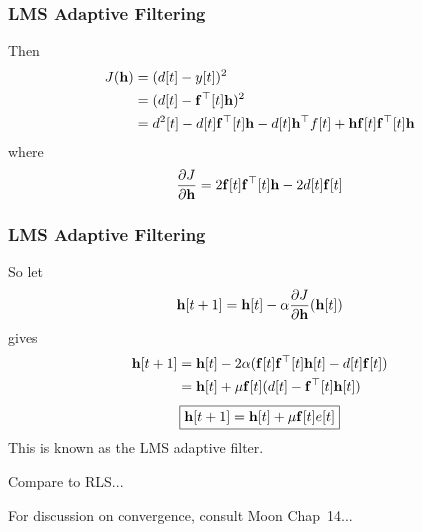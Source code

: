 \documentclass{beamer}
\begin{document}
\begin{frame}\frametitle{LMS Adaptive Filtering}
	Then
	\begin{align*}
		J(\mathbf{h}) 
			&= (d[t] - y[t])^2 \\
			&= (d[t] - \mathbf{f}^\top[t]\mathbf{h})^2\\
			&= d^2[t] - d[t]\mathbf{f}^\top[t]\mathbf{h} - d[t]\mathbf{h}^\top f[t] + \mathbf{h}\mathbf{f}[t]\mathbf{f}^\top[t]\mathbf{h}
	\end{align*}
	where 
	\[ 
		\frac{\partial J}{\partial \mathbf{h}} 
			= 2\mathbf{f}[t]\mathbf{f}^\top[t] \mathbf{h} - 2d[t]\mathbf{f}[t] 
	\]
\end{frame}

\begin{frame}\frametitle{LMS Adaptive Filtering}
	So let
	\[ 
		\mathbf{h}[t+1] = \mathbf{h}[t] - \alpha \frac{\partial J}{\partial \mathbf{h}}(\mathbf{h}[t]) 
	\]
	gives
	\begin{align*}
		 \mathbf{h}[t+1] 
		 	&= \mathbf{h}[t] - 2\alpha(\mathbf{f}[t]\mathbf{f}^\top[t]\mathbf{h}[t] - d[t]\mathbf{f}[t])\\
			&= \mathbf{h}[t] + \mu \mathbf{f}[t](d[t] - \mathbf{f}^\top[t]\mathbf{h}[t])\\
	\end{align*}
	\[
		\fbox{$\mathbf{h}[t+1] = \mathbf{h}[t] + \mu \mathbf{f}[t]e[t]$}
	\]
	This is known as the LMS adaptive filter.
	
	\vfill
	
	Compare to RLS...
	
	For discussion on convergence, consult Moon Chap~14...
\end{frame}
\end{document}
